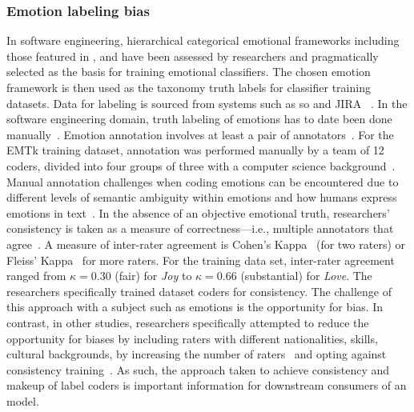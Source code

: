 \subsubsection{Emotion labeling bias}\label{caise2021:SubSubSection:EmotionLabelingBias}
In software engineering, hierarchical categorical emotional frameworks including those featured in \citet{Parrott2001}, \citet{Ekman1978} and \citet{shaver1987} have been assessed by researchers and pragmatically selected as the basis for training emotional classifiers.  The chosen emotion framework is then used as the taxonomy truth labels for classifier training datasets.  Data for labeling is sourced from systems such as \gls{so} and JIRA ~\citep{murgia2014, ortu2016, gachechiladze2017, novielli2018}.  In the software engineering domain, truth labeling of emotions has to date been done manually~\citep{murgia2014, novielli2018, gachechiladze2017}.  Emotion annotation involves at least a pair of annotators~\citep{Ghazi2010HierarchicalTexts, Aman2007IdentifyingText}. For the EMTk training dataset, annotation was performed manually by a team of 12 coders, divided into four groups of three with a computer science background~\citep{calefato2017, novielli2018}.  Manual annotation challenges when coding emotions can be encountered due to different levels of semantic ambiguity within emotions and how humans express emotions in text~\citep{Hasan2014UsingMessages}. In the absence of an objective emotional truth, researchers' consistency is taken as a measure of correctness---i.e., multiple annotators that agree~\citep{murgia2014}.  A measure of inter-rater agreement is Cohen's Kappa~\citep{Cohen:1960tf} (for two raters) or  Fleiss' Kappa~\citep{Fleiss:1971ff} for more raters.  For the training data set, inter-rater agreement ranged from  $\kappa=0.30$ (fair) for \textit{Joy} to $\kappa=0.66$ (substantial) for \textit{Love}.  The researchers specifically trained dataset coders for consistency. The challenge of this approach with a subject such as emotions is the opportunity for bias.  In contrast, in other studies, researchers specifically attempted to reduce the opportunity for biases by including raters with different nationalities, skills, cultural backgrounds, by increasing the number of raters~\citep{ortu2016} and opting against consistency training~\citep{Alm2005EmotionsText}.  As such, the approach taken to achieve consistency and makeup of label coders is important information for downstream consumers of an  model.

